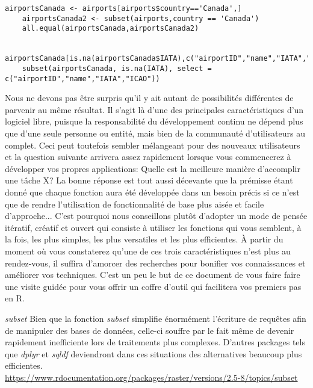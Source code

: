 \begin{lstlisting}[caption = Filtrer les données,label=src:Filter]
	airportsCanada <- airports[airports$country=='Canada',]
	airportsCanada2 <- subset(airports,country == 'Canada')
	all.equal(airportsCanada,airportsCanada2)

	airportsCanada[is.na(airportsCanada$IATA),c("airportID","name","IATA","ICAO")]
	subset(airportsCanada, is.na(IATA), select = c("airportID","name","IATA","ICAO"))
\end{lstlisting}

\vspace{\baselineskip}
\noindent
Nous ne devons pas être surpris qu'il y ait autant de possibilités différentes de parvenir au même résultat. Il s'agit là d'une des principales caractéristiques d'un logiciel libre, puisque la responsabilité du développement continu ne dépend plus que d'une seule personne ou entité, mais bien de la communauté d'utilisateurs au complet. Ceci peut toutefois sembler mélangeant pour des nouveaux utilisateurs et la question suivante arrivera assez rapidement lorsque vous commencerez à développer vos propres applications: Quelle est la meilleure manière d'accomplir une tâche X? La bonne réponse est tout aussi décevante que la prémisse étant donné que chaque fonction aura été développée dans un besoin précis si ce n'est que de rendre l'utilisation de fonctionnalité de base plus aisée et facile d'approche... C'est pourquoi nous conseillons plutôt d'adopter un mode de pensée itératif, créatif et ouvert qui consiste à utiliser les fonctions qui vous semblent, à la fois, les plus simples, les plus versatiles et les plus efficientes. À partir du moment où vous constaterez qu'une de ces trois caractéristiques n'est plus au rendez-vous, il suffira d'amorcer des recherches pour bonifier vos connaissances et améliorer vos techniques. C'est un peu le but de ce document de vous faire faire une visite guidée pour vous offrir un coffre d'outil qui facilitera vos premiers pas en R. \\

\begin{moreInfo}{\emph{subset}}
	Bien que la fonction \emph{subset} simplifie énormément l'écriture de requêtes afin de manipuler des bases de données, celle-ci souffre par le fait même de devenir rapidement inefficiente lors de traitements plus complexes. D'autres packages tels que \emph{dplyr} et \emph{sqldf} deviendront dans ces situations des alternatives beaucoup plus efficientes. \\
	\url{https://www.rdocumentation.org/packages/raster/versions/2.5-8/topics/subset}
\end{moreInfo}

